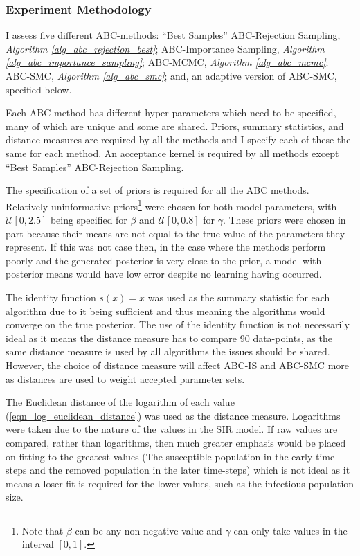 \documentclass[11pt,a4paper]{article}
\theoremstyle{break}
\begin{document}
\subsubsection*{Experiment Methodology}

  \par I assess five different ABC-methods: ``Best Samples'' ABC-Rejection Sampling, \textit{Algorithm \ref{alg_abc_rejection_best}}; ABC-Importance Sampling, \textit{Algorithm \ref{alg_abc_importance_sampling}}; ABC-MCMC, \textit{Algorithm \ref{alg_abc_mcmc}}; ABC-SMC, \textit{Algorithm \ref{alg_abc_smc}}; and, an adaptive version of ABC-SMC, specified below.

  \par Each ABC method has different hyper-parameters which need to be specified, many of which are unique and some are shared. Priors, summary statistics, and distance measures are required by all the methods and I specify each of these the same for each method. An acceptance kernel is required by all methods except ``Best Samples'' ABC-Rejection Sampling.

  \par The specification of a set of priors is required for all the ABC methods. Relatively uninformative priors\footnote{Note that $\beta$ can be any non-negative value and $\gamma$ can only take values in the interval $[0,1]$.} were chosen for both model parameters, with $\mathcal{U}[0,2.5]$ being specified for $\beta$ and $\mathcal{U}[0,0.8]$ for $\gamma$. These priors were chosen in part because their means are not equal to the true value of the parameters they represent. If this was not case then, in the case where the methods perform poorly and the generated posterior is very close to the prior, a model with posterior means would have low error despite no learning having occurred.

  \par The identity function $s(x)=x$ was used as the summary statistic for each algorithm due to it being sufficient and thus meaning the algorithms would converge on the true posterior. The use of the identity function is not necessarily ideal as it means the distance measure has to compare 90 data-points, as the same distance measure is used by all algorithms the issues should be shared. However, the choice of distance measure will affect ABC-IS and ABC-SMC more as distances are used to weight accepted parameter sets.

  \par The Euclidean distance of the logarithm of each value (\ref{eqn_log_euclidean_distance}) was used as the distance measure. Logarithms were taken due to the nature of the values in the SIR model. If raw values are compared, rather than logarithms, then much greater emphasis would be placed on fitting to the greatest values (The susceptible population in the early time-steps and the removed population in the later time-steps) which is not ideal as it means a loser fit is required for the lower values, such as the infectious population size.
\end{document}
